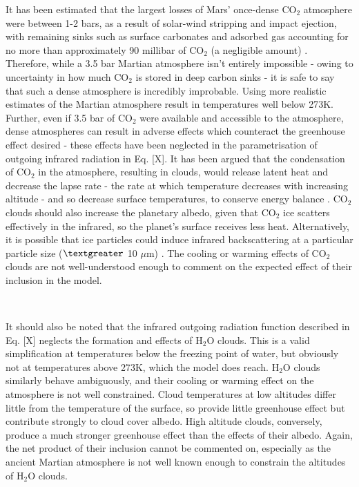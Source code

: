 \documentclass[12pt,onecolumn]{revtex4-2}    %
\begin{document}
It has been estimated that the largest losses of Mars' once-dense $\mathrm{CO_2}$ atmosphere were between 1-2 bars, as a result of solar-wind stripping and impact ejection, with remaining sinks such as surface carbonates and adsorbed gas accounting for no more than approximately 90 millibar of $\mathrm{CO_2}$ (a negligible amount) \cite{J19}. Therefore, while a 3.5 bar Martian atmosphere isn't entirely impossible - owing to uncertainty in how much $\mathrm{CO_2}$ is stored in deep carbon sinks - it is safe to say that such a dense atmosphere is incredibly improbable. Using more realistic estimates of the Martian atmosphere result in temperatures well below 273K. Further, even if 3.5 bar of $\mathrm{CO_2}$ were available and accessible to the atmosphere, dense atmospheres can result in adverse effects which counteract the greenhouse effect desired - these effects have been neglected in the parametrisation of outgoing infrared radiation in Eq. [X]. It has been argued that the condensation of $\mathrm{CO_2}$ in the atmosphere, resulting in clouds, would release latent heat and decrease the lapse rate - the rate at which temperature decreases with increasing altitude - and so decrease surface temperatures, to conserve energy balance \cite{K91}. $\mathrm{CO_2}$ clouds should also increase the planetary albedo, given that $\mathrm{CO_2}$ ice scatters effectively in the infrared, so the planet's surface receives less heat. Alternatively, it is possible that ice particles could induce infrared backscattering at a particular particle size ($\textgreater$ 10 $\mu$m) \cite{FP97}. The cooling or warming effects of $\mathrm{CO_2}$ clouds are not well-understood enough to comment on the expected effect of their inclusion in the model.

\

It should also be noted that the infrared outgoing radiation function described in Eq. [X] neglects the formation and effects of $\mathrm{H_2 O}$ clouds. This is a valid simplification at temperatures below the freezing point of water, but obviously not at temperatures above 273K, which the model does reach. $\mathrm{H_2 O}$ clouds similarly behave ambiguously, and their cooling or warming effect on the atmosphere is not well constrained. Cloud temperatures at low altitudes differ little from the temperature of the surface, so provide little greenhouse effect but contribute strongly to cloud cover albedo. High altitude clouds, conversely, produce a much stronger greenhouse effect than the effects of their albedo. Again, the net product of their inclusion cannot be commented on, especially as the ancient Martian atmosphere is not well known enough to constrain the altitudes of $\mathrm{H_2 O}$ clouds.
\end{document}
